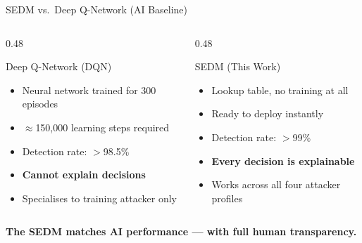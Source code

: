\documentclass[aspectratio=169, 12pt]{beamer}
\begin{document}
\begin{frame}{SEDM vs.\ Deep Q-Network (AI Baseline)}
  \begin{columns}[T]
    \begin{column}{0.48\textwidth}
      \begin{block}{Deep Q-Network (DQN)}
        \begin{itemize}
          \item Neural network trained for 300 episodes
          \item $\approx$150,000 learning steps required
          \item Detection rate: $>$98.5\%
          \item \textcolor{alertred}{\textbf{Cannot explain decisions}}
          \item Specialises to training attacker only
        \end{itemize}
      \end{block}
    \end{column}
    \begin{column}{0.48\textwidth}
      \begin{exampleblock}{SEDM (This Work)}
        \begin{itemize}
          \item Lookup table, no training at all
          \item Ready to deploy instantly
          \item Detection rate: $>$99\%
          \item \textcolor{safegreen}{\textbf{Every decision is explainable}}
          \item Works across all four attacker profiles
        \end{itemize}
      \end{exampleblock}
    \end{column}
  \end{columns}
  \vspace{0.4cm}
  \begin{center}
    \large\textcolor{honeyblue}{\textbf{The SEDM matches AI performance --- with full human transparency.}}
  \end{center}
\end{frame}
\end{document}
